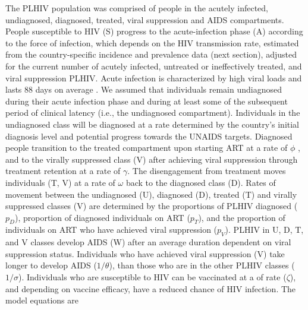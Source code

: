 \documentclass[11pt]{article}
\begin{document}
The PLHIV population was comprised of people in the acutely infected,
undiagnosed, diagnosed, treated, viral suppression and AIDS
compartments. People susceptible to HIV (S) progress to the
acute-infection phase (A) according to the force of infection, which
depends on the HIV transmission rate, estimated from the
country-specific incidence and prevalence data (next section),
adjusted for the current number of acutely infected, untreated or
ineffectively treated, and viral suppression PLHIV.  Acute infection
is characterized by high viral loads and lasts 88 days on average
\cite{Hollingsworth2008-iy}. We assumed that individuals remain
undiagnosed during their acute infection phase and during at least
some of the subsequent period of clinical latency (i.e., the
undiagnosed compartment). Individuals in the undiagnosed class will be
diagnosed at a rate determined by the country's initial diagnosis
level and potential progress towards the UNAIDS targets. Diagnosed
people transition to the treated compartment upon starting ART at a
rate of $\phi$ , and to the virally suppressed class (V) after
achieving viral suppression through treatment retention at a rate of
$\gamma$. The disengagement from treatment moves individuals (T, V) at
a rate of $\omega$ back to the diagnosed class (D). Rates of movement
between the undiagnosed (U), diagnosed (D), treated (T) and virally
suppressed classes (V) are determined by the proportions of PLHIV
diagnosed ($p_{D}$), proportion of diagnosed individuals on ART
($p_{T}$), and the proportion of individuals on ART who have achieved
viral suppression ($p_{V}$). PLHIV in U, D, T, and V classes develop
AIDS (W) after an average duration dependent on viral suppression
status. Individuals who have achieved viral suppression (V) take
longer to develop AIDS ($1/\theta$), than those who are in the other
PLHIV classes ($1/\sigma$). Individuals who are susceptible to HIV can
be vaccinated at a of rate ($\zeta$), and depending on vaccine
efficacy, have a reduced chance of HIV infection. The model equations
are
\end{document}
